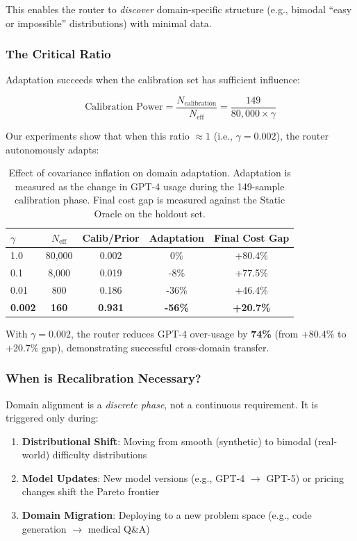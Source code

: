 This enables the router to \emph{discover} domain-specific structure (e.g., bimodal ``easy or impossible'' distributions) with minimal data.

\subsubsection{The Critical Ratio}

Adaptation succeeds when the calibration set has sufficient influence:

\begin{equation}
    \text{Calibration Power} = \frac{N_{\text{calibration}}}{N_{\text{eff}}} = \frac{149}{80{,}000 \times \gamma}
\end{equation}

Our experiments show that when this ratio $\approx 1$ (i.e., $\gamma = 0.002$), the router autonomously adapts:

\begin{table}[h]
\centering
\small
\begin{tabular}{@{}lcccc@{}}
\toprule
$\gamma$ & $N_{\text{eff}}$ & Calib/Prior & Adaptation & Final Cost Gap \\ \midrule
1.0 & 80,000 & 0.002 & 0\% & +80.4\% \\
0.1 & 8,000 & 0.019 & -8\% & +77.5\% \\
0.01 & 800 & 0.186 & -36\% & +46.4\% \\
\textbf{0.002} & \textbf{160} & \textbf{0.931} & \textbf{-56\%} & \textbf{+20.7\%} \\
\bottomrule
\end{tabular}
\caption{Effect of covariance inflation on domain adaptation. Adaptation is measured as the change in GPT-4 usage during the 149-sample calibration phase. Final cost gap is measured against the Static Oracle on the holdout set.}
\label{tab:gamma_scaling}
\end{table}

With $\gamma=0.002$, the router reduces GPT-4 over-usage by \textbf{74\%} (from +80.4\% to +20.7\% gap), demonstrating successful cross-domain transfer.

\subsubsection{When is Recalibration Necessary?}

Domain alignment is a \emph{discrete phase}, not a continuous requirement. It is triggered only during:

\begin{enumerate}
    \item \textbf{Distributional Shift}: Moving from smooth (synthetic) to bimodal (real-world) difficulty distributions
    \item \textbf{Model Updates}: New model versions (e.g., GPT-4 $\to$ GPT-5) or pricing changes shift the Pareto frontier
    \item \textbf{Domain Migration}: Deploying to a new problem space (e.g., code generation $\to$ medical Q\&A)
\end{enumerate}

